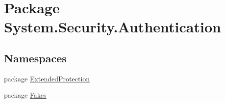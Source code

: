 \hypertarget{namespace_system_1_1_security_1_1_authentication}{\section{Package System.\-Security.\-Authentication}
\label{namespace_system_1_1_security_1_1_authentication}
}
\subsection*{Namespaces}
\begin{DoxyCompactItemize}
\item 
package \hyperlink{namespace_system_1_1_security_1_1_authentication_1_1_extended_protection}{Extended\-Protection}
\item 
package \hyperlink{namespace_system_1_1_security_1_1_authentication_1_1_fakes}{Fakes}
\end{DoxyCompactItemize}
